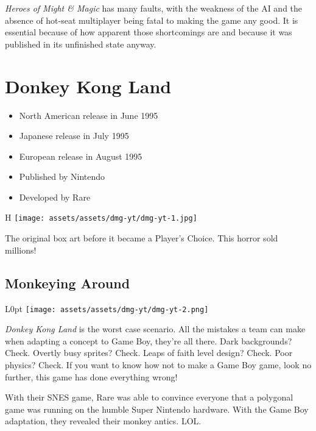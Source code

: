 \documentclass{book}
\begin{document}
\emph{Heroes of Might \& Magic} has many faults, with the weakness of the AI and the absence of hot-seat multiplayer being fatal to making the game any good. It is essential because of how apparent those shortcomings are and because it was published in its unfinished state anyway.


\begingroup \chapter*{Donkey Kong Land} \endgroup

\begin{itemize} \setlength\itemsep{-0.4em}
\item North American release in June 1995
\item Japanese release in July 1995
\item European release in August 1995
\item Published by Nintendo
\item Developed by Rare
\end{itemize}\noindent

\begin{wrapfigure}{H}{\linewidth}
\vskip 4pt
\centering \texttt{[image: assets/assets/dmg-yt/dmg-yt-1.jpg]}\par\pagetwodescription The original box art before it became a Player’s Choice. This horror sold millions!\end{wrapfigure}
\clearpage

\FloatBarrier\needspace{5pt}\section*{Monkeying Around}\nopagebreak[4]

\begin{wrapfigure}{L}{0pt} \texttt{[image: assets/assets/dmg-yt/dmg-yt-2.png]}\end{wrapfigure}
\emph{Donkey Kong Land} is the worst case scenario. All the mistakes a team can make when adapting a concept to Game Boy, they’re all there. Dark backgrounds? Check. Overtly busy sprites? Check. Leaps of faith level design? Check. Poor physics? Check. If you want to know how not to make a Game Boy game, look no further, this game has done everything wrong!

With their SNES game, Rare was able to convince everyone that a polygonal game was running on the humble Super Nintendo hardware. With the Game Boy adaptation, they revealed their monkey antics. LOL.
\end{document}
